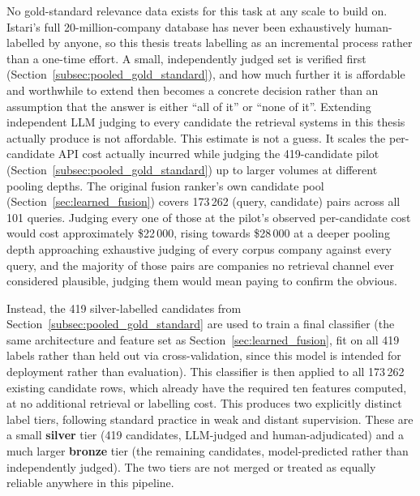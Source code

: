\documentclass[a4paper,oneside,bibliography=totoc]{scrbook}
\begin{document}
No gold-standard relevance data exists for this task at any scale to build on. Istari's full 20-million-company database has never been exhaustively human-labelled by anyone, so this thesis treats labelling as an incremental process rather than a one-time effort. A small, independently judged set is verified first (Section~\ref{subsec:pooled_gold_standard}), and how much further it is affordable and worthwhile to extend then becomes a concrete decision rather than an assumption that the answer is either ``all of it'' or ``none of it''. Extending independent LLM judging to every candidate the retrieval systems in this thesis actually produce is not affordable. This estimate is not a guess. It scales the per-candidate API cost actually incurred while judging the 419-candidate pilot (Section~\ref{subsec:pooled_gold_standard}) up to larger volumes at different pooling depths. The original fusion ranker's own candidate pool (Section~\ref{sec:learned_fusion}) covers 173\,262 (query, candidate) pairs across all 101 queries. Judging every one of those at the pilot's observed per-candidate cost would cost approximately \$22\,000, rising towards \$28\,000 at a deeper pooling depth approaching exhaustive judging of every corpus company against every query, and the majority of those pairs are companies no retrieval channel ever considered plausible, judging them would mean paying to confirm the obvious.

Instead, the 419 silver-labelled candidates from Section~\ref{subsec:pooled_gold_standard} are used to train a final classifier (the same architecture and feature set as Section~\ref{sec:learned_fusion}, fit on all 419 labels rather than held out via cross-validation, since this model is intended for deployment rather than evaluation). This classifier is then applied to all 173\,262 existing candidate rows, which already have the required ten features computed, at no additional retrieval or labelling cost. This produces two explicitly distinct label tiers, following standard practice in weak and distant supervision. These are a small \textbf{silver} tier (419 candidates, LLM-judged and human-adjudicated) and a much larger \textbf{bronze} tier (the remaining candidates, model-predicted rather than independently judged). The two tiers are not merged or treated as equally reliable anywhere in this pipeline.
\end{document}
